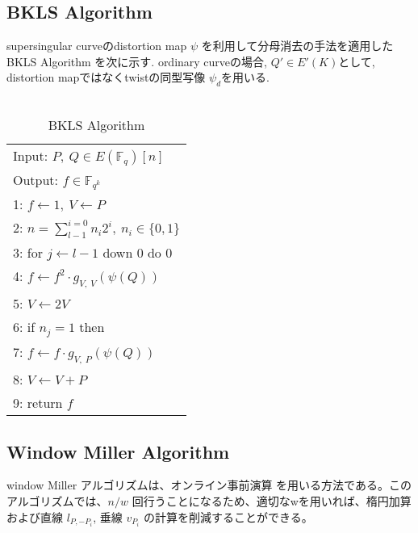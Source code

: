 \documentclass[twocolumn]{jsarticle} %
\begin{document}
\vspace{-5mm}
\subsection{BKLS Algorithm}
 supersingular curveのdistortion map $\psi$ を利用して分母消去の手法を適用したBKLS Algorithm \cite{BKLS02}を次に示す. ordinary curveの場合, $Q' \in E'(K)$として, distortion mapではなくtwistの同型写像 $\psi _d$を用いる. \\\\

\begin{table}[h]
 \begin{center}
  \begin{tabular}{|l|}
     \hline
 Input: $P,\ Q \in E(\mathbb{F}_q)[n]$\\
 Output: $f \in \mathbb{F}_{q^k} $\\
     \hline
 1: \quad $f \gets 1,\ V \gets P$\\
 2: \quad $n=\sum_{l-1}^{i=0} n_i 2^i, \ n_i \in \{0,1\}$\\
 3: \quad for $j \gets l-1$ down 0 do 0\\
 4: \quad \quad $f \gets f^2 \cdot g_{V,\ V}(\psi (Q))$\\
 5: \quad \quad $V \gets 2V$\\
 6: \quad if $n_j = 1$ then\\
 7: \quad \quad $f \gets f \cdot g_{V,\ P}(\psi (Q))$\\
 8: \quad \quad $V \gets V+P$\\
 9: \quad return $f$\\
     \hline
   \end{tabular}
 \end{center}
 \caption{BKLS Algorithm}
\end{table}
\par

\subsection{Window Miller Algorithm}

window Miller アルゴリズムは、オンライン事前演算 を用いる方法である。このアルゴリズムでは、$n/w$ 回行うことになるため、適切なwを用いれば、楕円加算および直線 $l _{P, -P_i}$, 垂線 $v _{P_i}$ の計算を削減することができる。
\par
\end{document}
